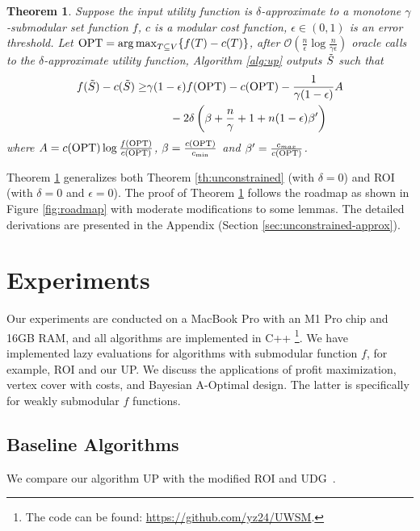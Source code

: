 \documentclass[10pt]{article} %
\DeclareMathOperator*{\argmax}{arg\,max}
\newtheorem{theorem}{Theorem}
\theoremstyle{remark}
\newcommand{\OPT}{{\rm OPT}}
\begin{document}
\begin{theorem}
\label{th:unconstrained-approx}
    Suppose the input utility function is $\delta$-approximate to a monotone $\gamma$-submodular set function $f$, $c$ is a modular cost function, $\epsilon \in (0,1)$ is an error threshold. Let $\OPT =  \argmax_{T \subseteq V}\{f(T)-c(T)\}$, after $\mathcal{O}(\frac{n}{\epsilon}\log \frac{n}{\gamma \epsilon})$ oracle calls to the $\delta$-approximate utility function,  Algorithm \ref{alg:up} outputs $\Tilde{S}$ such that
    \begin{align*}
        f(\Tilde{S})-c(\Tilde{S}) \geq &\gamma(1-\epsilon)f(\OPT)-c(\OPT)-\frac{1}{\gamma (1-\epsilon)}A \\
        &\quad\quad- 2\delta\left(\beta+ \frac{n}{\gamma} + 1 + n(1-\epsilon)\beta'\right)
    \end{align*}
    where $A = c(\OPT) \log \frac{f(\OPT)}{c(\OPT)}$, $\beta = \frac{c(\OPT)}{c_{\min}}$ and $\beta' = \frac{c_{max}}{c(\OPT)}$.
\end{theorem}
Theorem \ref{th:unconstrained-approx} generalizes both Theorem \ref{th:unconstrained} (with $\delta=0$) and ROI \cite{jin2021unconstrained} (with $\delta=0$ and $\epsilon=0$). 
The proof of Theorem \ref{th:unconstrained-approx} follows the roadmap as shown in Figure \ref{fig:roadmap} with moderate modifications to some lemmas. The detailed derivations are presented in the Appendix (Section \ref{sec:unconstrained-approx}).%
\section{Experiments}
\label{sec:experiments} 

Our experiments are conducted on a MacBook Pro with an M1 Pro chip and 16GB RAM, and all algorithms are implemented in C++ \footnote{The code can be found: \url{https://github.com/yz24/UWSM}.}.
We have implemented lazy evaluations \cite{minoux2005accelerated} for algorithms with submodular function $f$, for example, ROI and our UP. 
We discuss the applications of profit maximization, vertex cover with costs, and Bayesian A-Optimal design. The latter is specifically for weakly submodular $f$ functions.

\subsection{Baseline Algorithms} 
We compare our algorithm \textsc{UP} with the modified \textsc{ROI}  and \textsc{UDG}~\cite{harshaw2019submodular}. 
\end{document}
